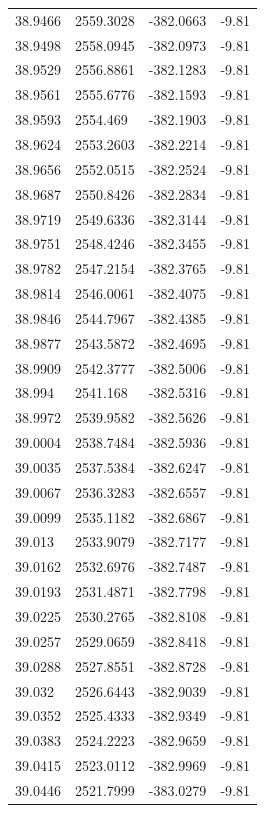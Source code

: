 \begin{table}[H]
\begin{tabular}{llll}
38.9466 & 2559.3028 & -382.0663 & -9.81 \\
38.9498 & 2558.0945 & -382.0973 & -9.81 \\
38.9529 & 2556.8861 & -382.1283 & -9.81 \\
38.9561 & 2555.6776 & -382.1593 & -9.81 \\
38.9593 & 2554.469 & -382.1903 & -9.81 \\
38.9624 & 2553.2603 & -382.2214 & -9.81 \\
38.9656 & 2552.0515 & -382.2524 & -9.81 \\
38.9687 & 2550.8426 & -382.2834 & -9.81 \\
38.9719 & 2549.6336 & -382.3144 & -9.81 \\
38.9751 & 2548.4246 & -382.3455 & -9.81 \\
38.9782 & 2547.2154 & -382.3765 & -9.81 \\
38.9814 & 2546.0061 & -382.4075 & -9.81 \\
38.9846 & 2544.7967 & -382.4385 & -9.81 \\
38.9877 & 2543.5872 & -382.4695 & -9.81 \\
38.9909 & 2542.3777 & -382.5006 & -9.81 \\
38.994 & 2541.168 & -382.5316 & -9.81 \\
38.9972 & 2539.9582 & -382.5626 & -9.81 \\
39.0004 & 2538.7484 & -382.5936 & -9.81 \\
39.0035 & 2537.5384 & -382.6247 & -9.81 \\
39.0067 & 2536.3283 & -382.6557 & -9.81 \\
39.0099 & 2535.1182 & -382.6867 & -9.81 \\
39.013 & 2533.9079 & -382.7177 & -9.81 \\
39.0162 & 2532.6976 & -382.7487 & -9.81 \\
39.0193 & 2531.4871 & -382.7798 & -9.81 \\
39.0225 & 2530.2765 & -382.8108 & -9.81 \\
39.0257 & 2529.0659 & -382.8418 & -9.81 \\
39.0288 & 2527.8551 & -382.8728 & -9.81 \\
39.032 & 2526.6443 & -382.9039 & -9.81 \\
39.0352 & 2525.4333 & -382.9349 & -9.81 \\
39.0383 & 2524.2223 & -382.9659 & -9.81 \\
39.0415 & 2523.0112 & -382.9969 & -9.81 \\
39.0446 & 2521.7999 & -383.0279 & -9.81 \\

\end{tabular}
\end{table}
